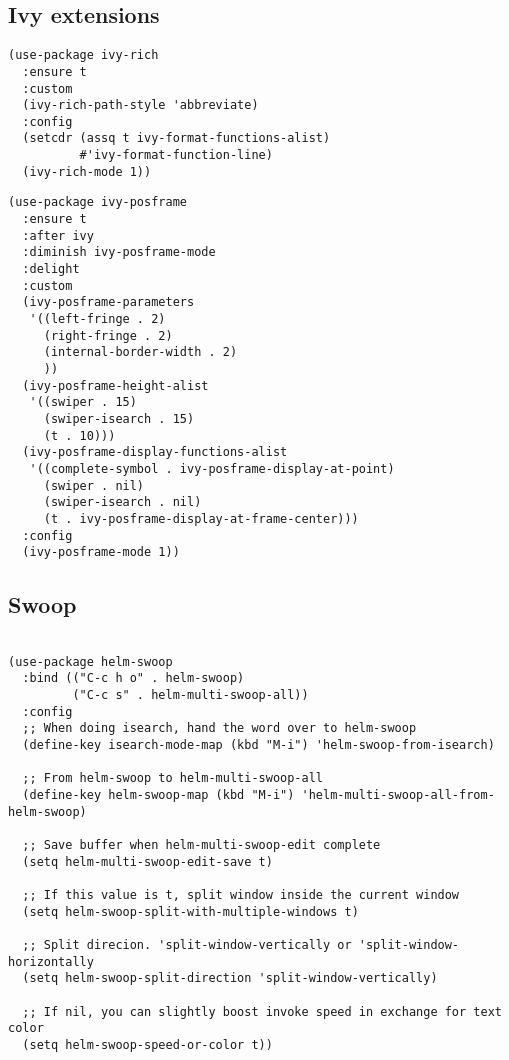 \documentclass[12pt]{article}
\begin{document}
\subsection{Ivy extensions}
\label{sec:orgc2ad601}

\begin{verbatim}
(use-package ivy-rich
  :ensure t
  :custom
  (ivy-rich-path-style 'abbreviate)
  :config
  (setcdr (assq t ivy-format-functions-alist)
          #'ivy-format-function-line)
  (ivy-rich-mode 1))
\end{verbatim}

\begin{verbatim}
(use-package ivy-posframe
  :ensure t
  :after ivy
  :diminish ivy-posframe-mode
  :delight
  :custom
  (ivy-posframe-parameters
   '((left-fringe . 2)
     (right-fringe . 2)
     (internal-border-width . 2)
     ))
  (ivy-posframe-height-alist
   '((swiper . 15)
     (swiper-isearch . 15)
     (t . 10)))
  (ivy-posframe-display-functions-alist
   '((complete-symbol . ivy-posframe-display-at-point)
     (swiper . nil)
     (swiper-isearch . nil)
     (t . ivy-posframe-display-at-frame-center)))
  :config
  (ivy-posframe-mode 1))
\end{verbatim}

\subsection{Swoop}
\label{sec:org97be216}
\begin{verbatim}

(use-package helm-swoop
  :bind (("C-c h o" . helm-swoop)
         ("C-c s" . helm-multi-swoop-all))
  :config
  ;; When doing isearch, hand the word over to helm-swoop
  (define-key isearch-mode-map (kbd "M-i") 'helm-swoop-from-isearch)

  ;; From helm-swoop to helm-multi-swoop-all
  (define-key helm-swoop-map (kbd "M-i") 'helm-multi-swoop-all-from-helm-swoop)

  ;; Save buffer when helm-multi-swoop-edit complete
  (setq helm-multi-swoop-edit-save t)

  ;; If this value is t, split window inside the current window
  (setq helm-swoop-split-with-multiple-windows t)

  ;; Split direcion. 'split-window-vertically or 'split-window-horizontally
  (setq helm-swoop-split-direction 'split-window-vertically)

  ;; If nil, you can slightly boost invoke speed in exchange for text color
  (setq helm-swoop-speed-or-color t))

\end{verbatim}
\end{document}
